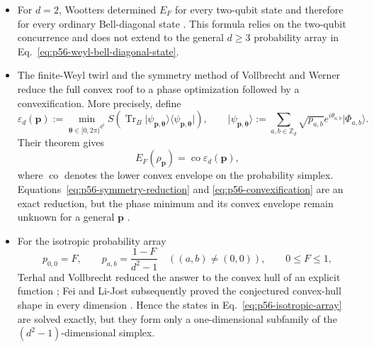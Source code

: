 \begin{itemize}
  \item For $d=2$, Wootters determined $E_F$ for every two-qubit state and
  therefore for every ordinary Bell-diagonal state
  .  This formula relies on the
  two-qubit concurrence and does not extend to the general $d\geq3$
  probability array in Eq.~\eqref{eq:p56-weyl-bell-diagonal-state}.

  \item The finite-Weyl twirl and the symmetry method of Vollbrecht and
  Werner reduce the full convex roof to a phase optimization followed by a
  convexification.  More precisely, define
  \begin{equation}
    \varepsilon_d(\mathbf p)
    :=\min_{\boldsymbol\theta\in[0,2\pi)^{d^2}}
       S\!\left(\operatorname{Tr}_B
          \lvert\psi_{\mathbf p,\boldsymbol\theta}\rangle
          \!\langle\psi_{\mathbf p,\boldsymbol\theta}\rvert\right),
    \qquad
    \lvert\psi_{\mathbf p,\boldsymbol\theta}\rangle
    :=\sum_{a,b\in\mathbb Z_d}
       \sqrt{p_{a,b}}e^{i\theta_{a,b}}\lvert\Phi_{a,b}\rangle.
    \label{eq:p56-symmetry-reduction}
  \end{equation}
  Their theorem gives
  \begin{equation}
    E_F(\rho_{\mathbf p})
    =\operatorname{co}\varepsilon_d(\mathbf p),
    \label{eq:p56-convexification}
  \end{equation}
  where $\operatorname{co}$ denotes the lower convex envelope on the
  probability simplex.  Equations~\eqref{eq:p56-symmetry-reduction} and
  \eqref{eq:p56-convexification} are an exact reduction, but the phase
  minimum and its convex envelope remain unknown for a general
  $\mathbf p$ .

  \item For the isotropic probability array
  \begin{equation}
    p_{0,0}=F,
    \qquad
    p_{a,b}=\frac{1-F}{d^2-1}\quad((a,b)\neq(0,0)),
    \qquad 0\leq F\leq1,
    \label{eq:p56-isotropic-array}
  \end{equation}
  Terhal and Vollbrecht reduced the answer to the convex hull of an explicit
  function ; Fei and Li-Jost
  subsequently proved the conjectured convex-hull shape in every dimension
  .  Hence the states in
  Eq.~\eqref{eq:p56-isotropic-array} are solved exactly, but they form only a
  one-dimensional subfamily of the $(d^2-1)$-dimensional simplex.


\end{itemize}
